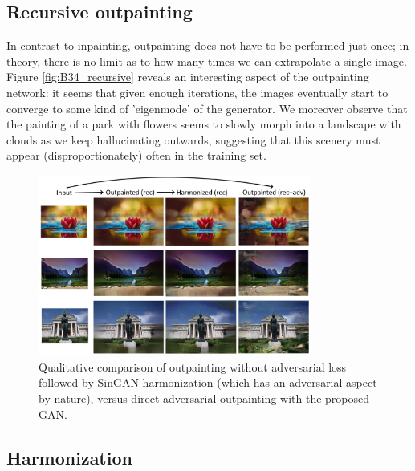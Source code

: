\documentclass[twocolumn,showpacs,%
  nofootinbib,aps,superscriptaddress,%
  eqsecnum,prd,notitlepage,showkeys,10pt]{revtex4-1}
\begin{document}
\subsection{Recursive outpainting}

\hspace{\parindent} In contrast to inpainting, outpainting does not have to be performed just once; in theory, there is no limit as to how many times we can extrapolate a single image. Figure \ref{fig:B34_recursive} reveals an interesting aspect of the outpainting network: it seems that given enough iterations, the images eventually start to converge to some kind of 'eigenmode' of the generator. We moreover observe that the painting of a park with flowers seems to slowly morph into a landscape with clouds as we keep hallucinating outwards, suggesting that this scenery must appear (disproportionately) often in the training set.

\begin{figure}[tp]
\centering
  \begin{adjustbox}{center}
  \includegraphics[width=0.8\textwidth]{singan}
  \end{adjustbox}
  \caption{Qualitative comparison of outpainting without adversarial loss followed by SinGAN harmonization (which has an adversarial aspect by nature), versus direct adversarial outpainting with the proposed GAN.}
  \label{fig:singan}
\end{figure}

\subsection{Harmonization}
\end{document}
